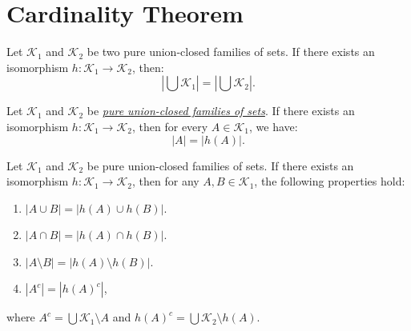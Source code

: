 \documentclass{beamer}
\begin{document}
\section{Cardinality Theorem}

\begin{frame}
	\begin{corollary}[2.1]
		Let \( \mathcal{K}_1 \) and \( \mathcal{K}_2 \) be two pure union-closed families of sets. If there exists an isomorphism \( h: \mathcal{K}_1 \to \mathcal{K}_2 \), then:
		\[
			\left|\bigcup \mathcal{K}_1\right| = \left|\bigcup \mathcal{K}_2\right|.
		\]
	\end{corollary}
	\vfill
	\pause
	\begin{theorem}[Cardinality]
		Let \( \mathcal{K}_1 \) and \( \mathcal{K}_2 \) be \textit{\hyperref[def:pure_collection]{pure union-closed families of sets}}. If there exists an isomorphism \( h: \mathcal{K}_1 \to \mathcal{K}_2 \), then for every \( A \in \mathcal{K}_1 \), we have:
		\[
			|A| = |h(A)|.
		\]
	\end{theorem}


\end{frame}

\begin{frame}
	\begin{corollary}[2.2]
		Let \( \mathcal{K}_1 \) and \( \mathcal{K}_2 \) be pure union-closed families of sets. If there exists an isomorphism \( h: \mathcal{K}_1 \to \mathcal{K}_2 \), then for any \(A, B \in \mathcal{K}_1\), the following properties hold:
		\begin{enumerate}
			\item \(|A \cup B| = |h(A) \cup h(B)|\).
			\item \(|A \cap B| = |h(A) \cap h(B)|\).
			\item \(|A \setminus B| = |h(A) \setminus h(B)|\).
			\item \(|A^c| = |h{(A)}^c|\),
		\end{enumerate}
		where \(A^c = \bigcup \mathcal{K}_1 \setminus A\) and
		\(h{(A)}^c = {\bigcup \mathcal{K}_2} \setminus h(A)\).

	\end{corollary}
\end{frame}
\end{document}
